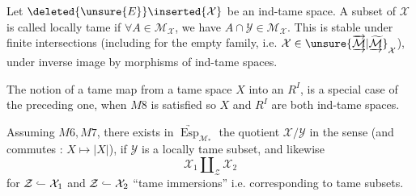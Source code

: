 Let $\deleted{\unsure{E}}\inserted{\mathcal X}$ be an ind-tame space. A subset  of $\mathcal X$ is called locally tame if $\forall A\in\mathcal M_{\mathcal X}$, we have $A\cap\mathcal Y\in\mathcal M_{\mathcal X}$. This is stable under finite intersections (including for the empty family, i.e. $\mathcal X\in\unsure{\underrightarrow{\overrightarrow{\mathcal M}}|\underrightarrow{\widetilde{\mathcal M}}}_{\mathcal X}$), under inverse image by  morphisms of ind-tame spaces.

The notion of a tame map from a tame space $X$ into an $R^I$, is a special case of the preceding one, when $M8$ is satisfied so $X$ and $R^I$ are both ind-tame spaces.

Assuming $M6,M7$, there exists  in $\underrightarrow{\operatorname{Esp}}_{\mathcal M_*}$ the quotient $\mathcal X/\mathcal Y$ in the sense (and commutes : $X\mapsto|X|$), if $\mathcal Y$ is a locally tame subset, and likewise
\[
 \mathcal X_1\amalg_{\mathcal Z}\mathcal X_2
\]
for $\mathcal Z\lhook\joinrel\relbar\mathcal X_1$ and $\mathcal Z\lhook\joinrel\relbar\mathcal X_2$ ``tame immersions'' i.e. corresponding to  tame subsets.

